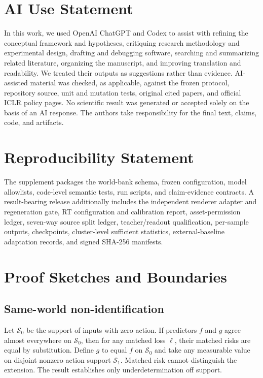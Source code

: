 \documentclass{article}
\begin{document}
\section*{AI Use Statement}

In this work, we used OpenAI ChatGPT and Codex to assist with refining the
conceptual framework and hypotheses, critiquing research methodology and
experimental design, drafting and debugging software, searching and summarizing
related literature, organizing the manuscript, and improving translation and
readability.  We treated their outputs as suggestions rather than evidence.
AI-assisted material was checked, as applicable, against the frozen protocol,
repository source, unit and mutation tests, original cited papers, and official
ICLR policy pages.  No scientific result was generated or accepted solely on
the basis of an AI response.  The authors take responsibility for the final
text, claims, code, and artifacts.

\section*{Reproducibility Statement}

The supplement packages the world-bank schema, frozen configuration, model
allowlists, code-level semantic tests, run scripts, and claim-evidence
contracts.  A result-bearing release additionally includes the independent renderer
adapter and regeneration gate, RT configuration and calibration report,
asset-permission ledger, seven-way source split ledger, teacher/readout
qualification, per-sample outputs, checkpoints, cluster-level sufficient
statistics, external-baseline adaptation records, and signed SHA-256 manifests.




\appendix

\section{Proof Sketches and Boundaries}

\subsection{Same-world non-identification}
Let $\mathcal S_0$ be the support of inputs with zero action.  If predictors
$f$ and $g$ agree almost everywhere on $\mathcal S_0$, then for any matched
loss $\ell$, their matched risks are equal by substitution.  Define $g$ to
equal $f$ on $\mathcal S_0$ and take any measurable value on disjoint nonzero
action support $\mathcal S_1$.  Matched risk cannot distinguish the extension.
The result establishes only underdetermination off support.
\end{document}
